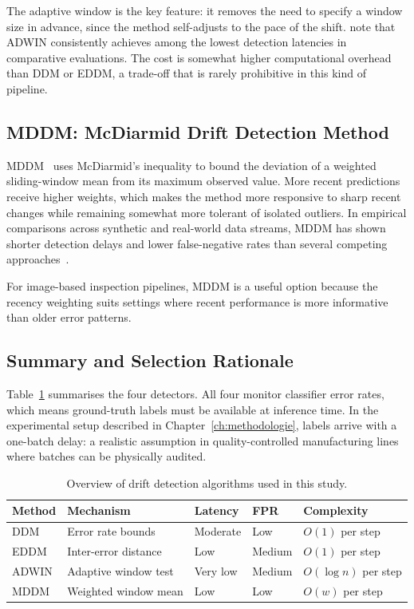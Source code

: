 The adaptive window is the key feature: it removes the need to specify a window size in advance, since the method self-adjusts to the pace of the shift. \textcite{Bayram2022} note that ADWIN consistently achieves among the lowest detection latencies in comparative evaluations. The cost is somewhat higher computational overhead than DDM or EDDM, a trade-off that is rarely prohibitive in this kind of pipeline.

\subsection{MDDM: McDiarmid Drift Detection Method}

MDDM~\autocite{Pesaranghader2017} uses McDiarmid's inequality to bound the deviation of a weighted sliding-window mean from its maximum observed value. More recent predictions receive higher weights, which makes the method more responsive to sharp recent changes while remaining somewhat more tolerant of isolated outliers. In empirical comparisons across synthetic and real-world data streams, MDDM has shown shorter detection delays and lower false-negative rates than several competing approaches~\autocite{Pesaranghader2017}.

For image-based inspection pipelines, MDDM is a useful option because the recency weighting suits settings where recent performance is more informative than older error patterns.

\subsection{Summary and Selection Rationale}

Table~\ref{tab:detectors} summarises the four detectors. All four monitor classifier error rates, which means ground-truth labels must be available at inference time. In the experimental setup described in Chapter~\ref{ch:methodologie}, labels arrive with a one-batch delay: a realistic assumption in quality-controlled manufacturing lines where batches can be physically audited.

\begin{table}[h]
  \centering
  \caption[Drift detectors compared]{Overview of drift detection algorithms used in this study.}
  \label{tab:detectors}
  \small
  \begin{tabular}{lllll}
    \toprule
    \textbf{Method} & \textbf{Mechanism} & \textbf{Latency} & \textbf{FPR} & \textbf{Complexity} \\
    \midrule
    DDM   & Error rate bounds        & Moderate & Low    & $O(1)$ per step \\
    EDDM  & Inter-error distance     & Low      & Medium & $O(1)$ per step \\
    ADWIN & Adaptive window test     & Very low & Medium & $O(\log n)$ per step \\
    MDDM  & Weighted window mean     & Low      & Low    & $O(w)$ per step \\
    \bottomrule
  \end{tabular}
\end{table}

